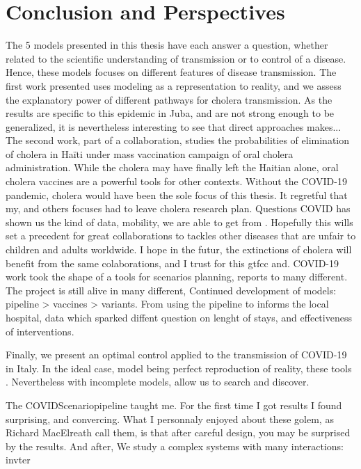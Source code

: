 \chapter{Conclusion and Perspectives}
The 5 models presented in this thesis have each answer a question, whether related to the scientific understanding of transmission or to control of a disease. Hence, these models focuses on different features of disease transmission. 
The first work presented uses modeling as a representation to reality, and we assess the explanatory power of different pathways for cholera transmission. As the results are  specific to this epidemic in Juba, and are not strong enough to be generalized, it is nevertheless interesting to see that direct approaches makes... The second work, part of a collaboration, studies the probabilities of elimination of cholera in Haïti under mass vaccination campaign of oral cholera administration. While the cholera may have finally left the Haitian alone, oral cholera vaccines are a powerful tools for other contexts.
Without the COVID-19 pandemic, cholera would have been the sole focus of this thesis. It regretful that my, and others focuses had to leave cholera research plan. Questions 
 COVID has shown us the kind of data, mobility, we are able to get from . Hopefully this wills set a precedent for great collaborations to tackles other diseases that are unfair to children and adults worldwide.  I hope in the futur, the extinctions of cholera will benefit from the same colaborations, and I trust for this gtfcc and.
 COVID-19 work took the shape of a tools for scenarios planning, reports to many different. The project is still alive in many different, Continued development of models: pipeline > vaccines > variants.
From using the pipeline to informs the local hospital, data which sparked diffent question on lenght of stays, and effectiveness of interventions.

Finally, we present an optimal control applied to the transmission of COVID-19 in Italy. In the ideal case, model being perfect reproduction of reality, these tools . Nevertheless with incomplete models, allow us to search and discover. 

The COVIDScenariopipeline taught me. For the first time I got results I found surprising, and convercing.  What I personnaly enjoyed about these golem, as Richard MacElreath call them, is that after careful design, you may be surprised by the results. And after,
We study a complex systems with many interactions: invter



